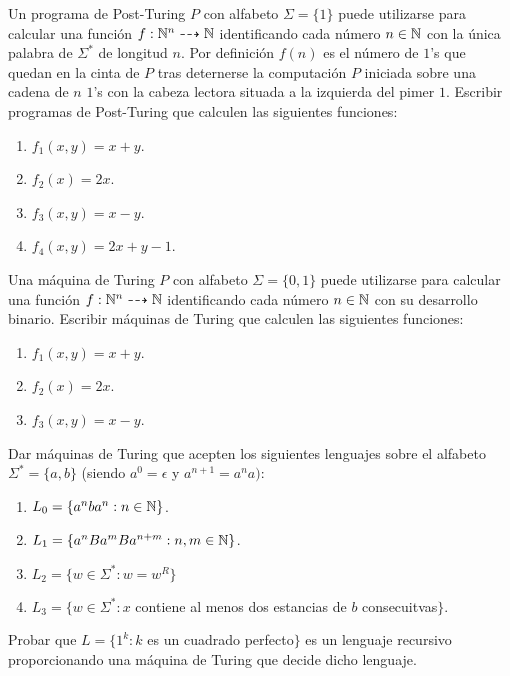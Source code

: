 \documentclass[twoside]{article}
\begin{document}
\begin{ejercicio}{4}
Un programa de Post-Turing $P$ con alfabeto $Σ=\{1\}$ puede utilizarse para calcular una función $f : \mathbb{N}^n \dashrightarrow \mathbb{N}$ identificando cada número $n \in \mathbb{N}$ con la única palabra de $Σ^*$ de longitud $n$. Por definición $f(n)$ es el número de $1$'s que quedan en la cinta de $P$ tras deternerse la computación $P$ iniciada sobre una cadena de $n$ $1$'s con la cabeza lectora situada a la izquierda del pimer $1$. Escribir programas de Post-Turing que calculen las siguientes funciones:
\begin{enumerate}
	\item $f_1(x,y)=x+y$.
	\item $f_2(x)=2x$.
	\item $f_3(x,y)=x-y$.
	\item $f_4(x,y)=2x+y-1$.
\end{enumerate}
\end{ejercicio}

\begin{ejercicio}{5}
Una máquina de Turing $P$ con alfabeto $Σ=\{0,1\}$ puede utilizarse para calcular una función $f : \mathbb{N}^n \dashrightarrow \mathbb{N}$ identificando cada número $n \in \mathbb{N}$ con su desarrollo binario. Escribir máquinas de Turing que calculen las siguientes funciones:
\begin{enumerate}
	\item $f_1(x,y)=x+y$.
	\item $f_2(x)=2x$.
	\item $f_3(x,y)=x-y$.
\end{enumerate}
\end{ejercicio}

\begin{ejercicio}{6}
Dar máquinas de Turing que acepten los siguientes lenguajes sobre el alfabeto $Σ^*=\{a,b\}$ (siendo $a^0=ϵ$ y $a^{n+1}=a^na)$:
\begin{enumerate}
	\item $L_0 = \{a^nba^n : n\in\mathbb{N}\}$.
	\item $L_1=\{a^nBa^mBa^{n+m} : n,m\in\mathbb{N}\}$.
	\item $L_2=\{w\in Σ^* : w=w^R\}$
	\item $L_3=\{w\in Σ^*: x$ contiene al menos dos estancias de $b$ consecuitvas$\}$.
\end{enumerate}
\end{ejercicio}

\begin{ejercicio}{7}
Probar que $L=\{1^k : k$ es un cuadrado perfecto$\}$ es un lenguaje recursivo proporcionando una máquina de Turing que decide dicho lenguaje.
\end{ejercicio}
\end{document}
